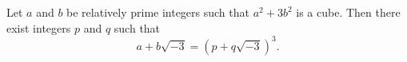 Let $a$ and $b$ be relatively prime integers such that $a^2 + 3b^2$ is a cube. Then there exist integers $p$ and $q$ such that
$$a + b\sqrt{-3} = (p + q\sqrt{-3})^3.$$
